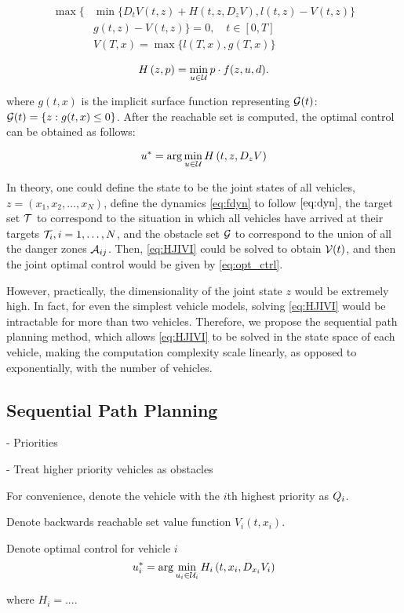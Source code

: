 \begin{equation}
\label{eq:HJIVI}
\begin{aligned}
\max\Big\{&\min\big\{D_t V(t, z) + H\left(t, z, D_z V\right), l(t,z) - V(t, z)\big\}\\
& g(t, z) - V(t, z)\Big\} = 0, \quad t\in[0,T]\\
&V(T, x) = \max\big\{l(T, x), g(T, x)\big\}
\end{aligned}
\end{equation}

\begin{equation*}
H\left(z, p\right) = \min_{u \in \mathcal{U}} p \cdot f(z, u, d).
\end{equation*}

\noindent where $g(t, x)$ is the implicit surface function representing $\mathcal{G}(t)$: $\mathcal{G}(t) = \{z: g(t, x) \le 0\}$. After the reachable set is computed, the optimal control can be obtained as follows:

\begin{equation}
\label{eq:opt_ctrl}
u^* = \arg \min_{u \in \mathcal{U}} H\left(t, z, D_z V\right)
\end{equation}

In theory, one could define the state to be the joint states of all vehicles, $z = (x_1, x_2, \ldots, x_N)$, define the dynamics \eqref{eq:fdyn} to follow $\eqref{eq:dyn}$, the target set $\mathcal{T}$ to correspond to the situation in which all vehicles have arrived at their targets $\mathcal{T}_i, i = 1, \ldots, N$, and the obstacle set $\mathcal{G}$ to correspond to the union of all the danger zones $\mathcal{A}_{ij}$. Then, \eqref{eq:HJIVI} could be solved to obtain $\mathcal{V}(t)$, and then the joint optimal control would be given by \eqref{eq:opt_ctrl}.

However, practically, the dimensionality of the joint state $z$ would be extremely high. In fact, for even the simplest vehicle models, solving \eqref{eq:HJIVI} would be intractable for more than two vehicles. Therefore, we propose the sequential path planning method, which allows \eqref{eq:HJIVI} to be solved in the state space of each vehicle, making the computation complexity scale linearly, as opposed to exponentially, with the number of vehicles.

\subsection{Sequential Path Planning}
- Priorities

- Treat higher priority vehicles as obstacles

For convenience, denote the vehicle with the $i$th highest priority as $Q_i$.

Denote backwards reachable set value function $V_i(t, x_i)$.

Denote optimal control for vehicle $i$
\begin{equation}
\label{eq:opt_ctrl_i}
u_i^* = \arg \min_{u_i \in \mathcal{U}_i} H_i\left(t, x_i, D_{x_i} V_i\right)
\end{equation}

\noindent where $H_i = ...$.